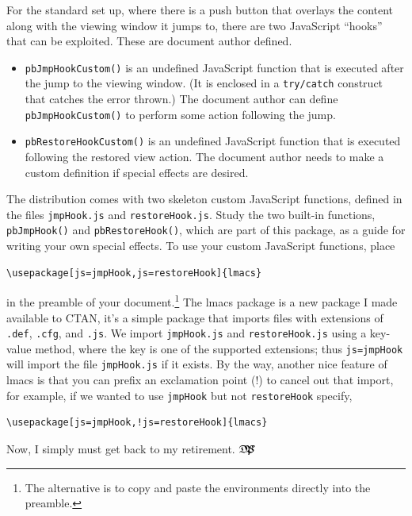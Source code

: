 \documentclass{article}
\def\dps{$\hbox{$\mathfrak D$\kern-.3em\hbox{$\mathfrak P$}%
   \kern-.6em \hbox{$\mathcal S$}}$}
\begin{document}
For the standard set up, where there is a push button that overlays the
content along with the viewing window it jumps to, there are two JavaScript
``hooks'' that can be exploited. These are document author defined.
\begin{itemize}
    \item \texttt{pbJmpHookCustom()} is an undefined JavaScript
        function that is executed after the jump to the viewing
        window. (It is enclosed in a \texttt{try/catch} construct that
        catches the error thrown.) The document author can define
        \texttt{pbJmpHookCustom()} to perform some action following the
        jump.
    \item \texttt{pbRestoreHookCustom()} is an undefined JavaScript
        function that is executed following the restored view action.
        The document author needs to make a custom definition if
        special effects are desired.
\end{itemize}
The distribution comes with two skeleton custom JavaScript functions, defined
in the files \texttt{jmpHook.js} and \texttt{restoreHook.js}. Study the two
built-in functions, \texttt{pbJmpHook()} and \texttt{pbRestoreHook()}, which
are part of this package, as a guide for writing your own special effects. To
use your custom JavaScript functions, place
\begin{Verbatim}[xleftmargin=\amtIndent]
\usepackage[js=jmpHook,js=restoreHook]{lmacs}
\end{Verbatim}
in the preamble of your document.\footnote{The alternative is to copy and
paste the  environments directly into the preamble.} The
\textsf{lmacs} package is a new package I made available to CTAN, it's a
simple package that imports files with extensions of \texttt{.def},
\texttt{.cfg}, and \texttt{.js}. We import \texttt{jmpHook.js} and
\texttt{restoreHook.js} using a key-value method, where the key is one of the
supported extensions; thus \texttt{js=jmpHook} will import the file
\texttt{jmpHook.js} if it exists. By the way, another nice feature of
\textsf{lmacs} is that you can prefix an exclamation point (!) to cancel out
that import, for example, if we wanted to use \texttt{jmpHook} but not
\texttt{restoreHook} specify,
\begin{Verbatim}[xleftmargin=\amtIndent]
\usepackage[js=jmpHook,!js=restoreHook]{lmacs}
\end{Verbatim}

\newtopic\noindent
Now, I simply must get back to my retirement. \dps
\end{document}

